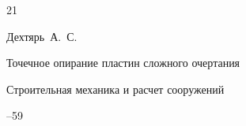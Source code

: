 \RusRef

\begin{thebibliography}{21}

%












\by Дехтярь~А.~С.

\paper Точечное опирание пластин сложного очертания

\jour Строительная механика и расчет сооружений



--59








%











\end{thebibliography}
